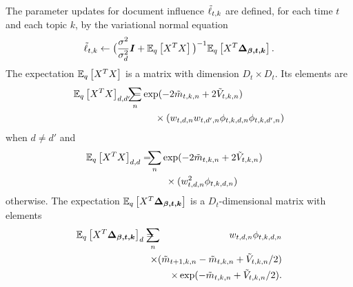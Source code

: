 The parameter updates for document influence $\tilde{\ell}_{t,k}$ are
defined, for each time $t$ and each topic $k$, by the
variational normal equation
\[
\tilde{\ell}_{t, k} \gets \big(  \frac{\sigma^2}{\sigma^2_{d}} \bm I
  + \mathbb{E}_q\left[X^T X\right] \big)^{-1} \mathbb{E}_q\left[X^T \bm{\Delta_{\beta,t,k}}\right].
\]
The expectation $\mathbb{E}_q\left[X^TX\right]$ is a matrix with dimension $D_t \times D_t$.  Its elements are
\begin{eqnarray*}
 {\expectq{X^T X}}_{d,d'} = & \hspace{-15pt}  \sum_n \exp(-2\mv_{t,k,n} + 2 \vv_{t,k,n}) \\
  & \hspace{14pt} \times (w_{t,d,n} w_{t,d',n} \phi_{t,k,d,n } \phi_{t,k,d',n})
\vspace{-20pt}
\end{eqnarray*}
when $d \neq d'$ and
\begin{eqnarray*}
\vspace{-20pt}
\hspace{-10pt}  {\expectq{X^T X}}_{d,d} = & \hspace{-5pt}  \sum_n \exp(-2\mv_{t,k,n} + 2 \vv_{t,k,n}) \\
  & \hspace{15pt} \times (w_{t,d,n}^2 \phi_{t,k,d,n}) \\
\end{eqnarray*}
otherwise. The expectation $\mathbb{E}_q\left[X^T \bm{\Delta_{\beta,t,k}}\right]$
is a $D_t$-dimensional matrix with elements
\begin{eqnarray*}
 {\expectq{X^T \bm{\Delta_{\beta,t,k}}}}_d = & \hspace{-10pt} \sum_n & \hspace{-10pt} w_{t,d,n} \phi_{t,k,d,n} \nonumber \\
 && \hspace{-20pt} \times (\mv_{t+1,k,n} - \mv_{t,k,n} + \vv_{t,k,n}/2) \nonumber \\
 && \hspace{-20pt} \times \exp(-\mv_{t,k,n} + \vv_{t,k,n}/2). \nonumber
\end{eqnarray*}

